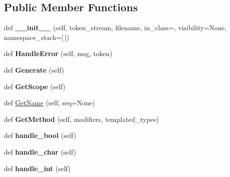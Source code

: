 \subsection*{Public Member Functions}
\begin{DoxyCompactItemize}
\item 
\mbox{\label{classcpp_1_1ast_1_1_ast_builder_aaf35e2f9d395c99a38e6bb6f9b5dd047}} 
def {\bfseries \+\_\+\+\_\+init\+\_\+\+\_\+} (self, token\+\_\+stream, filename, in\+\_\+class=\textquotesingle{}\textquotesingle{}, visibility=None, namespace\+\_\+stack=\mbox{[}$\,$\mbox{]})
\item 
\mbox{\label{classcpp_1_1ast_1_1_ast_builder_a3e610662018d674f6c57ef19254cc470}} 
def {\bfseries Handle\+Error} (self, msg, token)
\item 
\mbox{\label{classcpp_1_1ast_1_1_ast_builder_aebd0392eee56def849468af5b93b720a}} 
def {\bfseries Generate} (self)
\item 
\mbox{\label{classcpp_1_1ast_1_1_ast_builder_add6826421ce64546a7dbb9b2e699a4d4}} 
def {\bfseries Get\+Scope} (self)
\item 
def \mbox{\hyperlink{classcpp_1_1ast_1_1_ast_builder_a327957c4228325fc5f64821b047bdc6f}{Get\+Name}} (self, seq=None)
\item 
\mbox{\label{classcpp_1_1ast_1_1_ast_builder_af22fb880867876144d20818391ad267a}} 
def {\bfseries Get\+Method} (self, modifiers, templated\+\_\+types)
\item 
\mbox{\label{classcpp_1_1ast_1_1_ast_builder_ac5a5e19e5be6501d351891cc0ead5f53}} 
def {\bfseries handle\+\_\+bool} (self)
\item 
\mbox{\label{classcpp_1_1ast_1_1_ast_builder_adfbb93646d0d32b39a19f3c70cc031f8}} 
def {\bfseries handle\+\_\+char} (self)
\item 
\mbox{\label{classcpp_1_1ast_1_1_ast_builder_a6f824335dd53e12a76d6f91ab69c627c}} 
def {\bfseries handle\+\_\+int} (self)
\item 

\end{DoxyCompactItemize}
